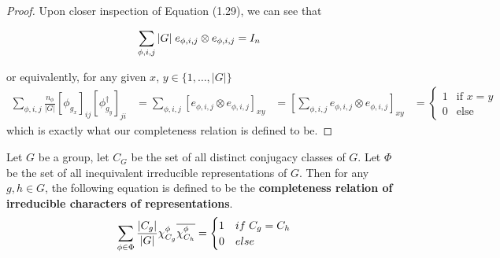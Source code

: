 \begin{proof}
Upon closer inspection of Equation (1.29), we can see that 

\begin{equation}
	\begin{aligned}
		\sum_{\phi,i,j} {|G|} \hspace{1mm}e_{\phi,i,j} \otimes e_{\phi,i,j} &= I_n
	\end{aligned}
\end{equation}

or equivalently, for any given $x$, $y \in \{1,\hdots,|G|\}$ 
\begin{equation}
	\begin{aligned}
		\sum_{\phi,i,j} \frac{n_\phi}{|G|} [\phi_{g_x}]_{ij}[\phi^\dag_{g_y}]_{ji} &= \sum_{\phi,i,j} \left[e_{\phi,i,j} \otimes e_{\phi,i,j}\right]_{xy} &= \left[\sum_{\phi,i,j} e_{\phi,i,j} \otimes e_{\phi,i,j}\right]_{xy} &= \begin{cases}
																	1 & \text{if } x=y\\
																	0 & \text{else}
																\end{cases}
	\end{aligned}
\end{equation}
which is exactly what our completeness relation is defined to be. \end{proof} 







\begin{theorem}
Let $G$ be a group, let $C_G$ be the set of all distinct conjugacy classes of $G$. Let $\Phi$ be the set of all inequivalent irreducible representations of $G$. Then for any $g,h \in G$, the following equation is defined to be the \textbf{completeness relation of irreducible characters of representations}.
$$\sum_{\phi \in \Phi} \frac{|C_g|}{|G|} \chi^{\phi}_{C_g} \overline{\chi^{\phi}_{C_h}} = \begin{cases}
																1 & if \hspace{1mm} C_g = C_h \\
																0 & else
															\end{cases}$$
\end{theorem}

